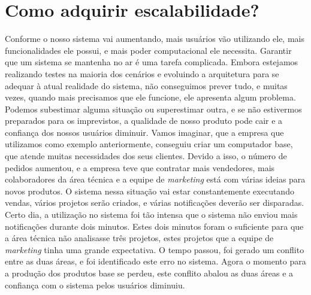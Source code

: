   \section{Como adquirir escalabilidade?}
    Conforme o nosso sistema vai aumentando, mais usuários vão utilizando ele,
    mais funcionalidades ele possui, e mais poder computacional ele necessita.
    Garantir que um sistema se mantenha no ar é uma tarefa complicada. Embora
    estejamos realizando testes na maioria dos cenários e evoluindo a arquitetura
    para se adequar à atual realidade do sistema, não conseguimos prever tudo, e
    muitas vezes, quando mais precisamos que ele funcione, ele apresenta algum
    problema. Podemos subestimar alguma situação ou superestimar outra, e se não
    estivermos preparados para os imprevistos, a qualidade de nosso produto pode
    cair e a confiança dos nossos usuários diminuir. \newline
    Vamos imaginar, que a empresa que utilizamos como exemplo anteriormente,
    conseguiu criar um computador base, que atende muitas necessidades dos seus
    clientes. Devido a isso, o número de pedidos aumentou, e a empresa teve que
    contratar mais vendedores, mais colaboradores da área técnica e a equipe de
    \textit{marketing} está com várias ideias para novos produtos. O sistema
    nessa situação vai estar constantemente executando vendas, vários projetos
    serão criados, e várias notificações deverão ser disparadas. Certo dia, a
    utilização no sistema foi tão intensa que o sistema não enviou mais notificações
    durante dois minutos. Estes dois minutos foram o suficiente para que a área
    técnica não analisasse três projetos, estes projetos que a equipe de
    \textit{marketing} tinha uma grande expectativa. O tempo passou, foi gerado
    um conflito entre as duas áreas, e foi identificado este erro no sistema.
    Agora o momento para a produção dos produtos base se perdeu, este conflito
    abalou as duas áreas e a confiança com o sistema pelos usuários diminuiu.

